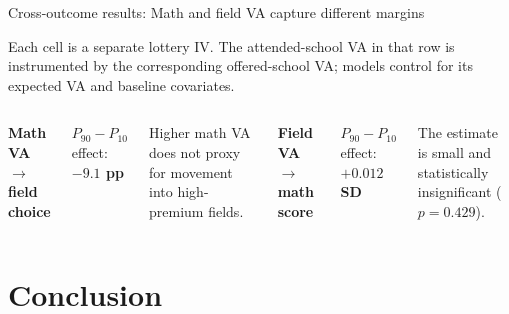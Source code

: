 \documentclass[11pt,aspectratio=169]{beamer}
\newcommand{\key}[1]{\textcolor{mDarkTeal}{\textbf{#1}}}
\begin{document}
\begin{frame}[label=cross_outcome_results]{Cross-outcome results: Math and field VA capture different margins}
\centering
\scriptsize


\vspace{0.45em}
\tiny
Each cell is a separate lottery IV. The attended-school VA in that row is instrumented by the corresponding offered-school VA; models control for its expected VA and baseline covariates.

\vspace{0.7em}
\begin{columns}[T,onlytextwidth]
  \centering
  \textbf{Math VA $\rightarrow$ field choice}

  \vspace{0.25em}
  \normalsize
  $P_{90}-P_{10}$ effect: \key{$-9.1$ pp}

  \footnotesize
  Higher math VA does not proxy for movement into high-premium fields.

  \centering
  \textbf{Field VA $\rightarrow$ math score}

  \vspace{0.25em}
  \normalsize
  $P_{90}-P_{10}$ effect: \key{$+0.012$ SD}

  \footnotesize
  The estimate is small and statistically insignificant ($p=0.429$).
\end{columns}

\vspace{0.45em}
\hyperlink{cross_outcome_spec}{}
\end{frame}

\section{Conclusion}
\end{document}
